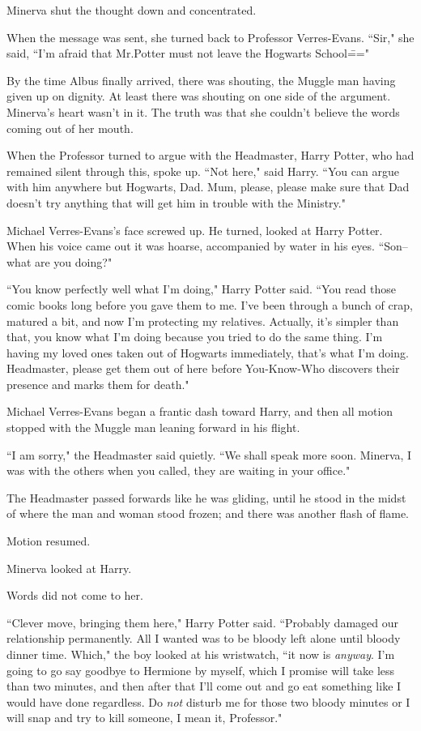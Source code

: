 Minerva shut the thought down and concentrated.

When the message was sent, she turned back to Professor Verres-Evans. ``Sir," she said, ``I'm afraid that Mr.\?Potter must not leave the Hogwarts School\==="

By the time Albus finally arrived, there was shouting, the Muggle man having given up on dignity. At least there was shouting on one side of the argument. Minerva's heart wasn't in it. The truth was that she couldn't believe the words coming out of her mouth.

When the Professor turned to argue with the Headmaster, Harry Potter, who had remained silent through this, spoke up. ``Not here," said Harry. ``You can argue with him anywhere but Hogwarts, Dad. Mum, please, please make sure that Dad doesn't try anything that will get him in trouble with the Ministry."

Michael Verres-Evans's face screwed up. He turned, looked at Harry Potter. When his voice came out it was hoarse, accompanied by water in his eyes. ``Son\---what are you doing?"

``You know perfectly well what I'm doing," Harry Potter said. ``You read those comic books long before you gave them to me. I've been through a bunch of crap, matured a bit, and now I'm protecting my relatives. Actually, it's simpler than that, you know what I'm doing because you tried to do the same thing. I'm having my loved ones taken out of Hogwarts immediately, that's what I'm doing. Headmaster, please get them out of here before You-Know-Who discovers their presence and marks them for death."

Michael Verres-Evans began a frantic dash toward Harry, and then all motion stopped with the Muggle man leaning forward in his flight.

``I am sorry," the Headmaster said quietly. ``We shall speak more soon. Minerva, I was with the others when you called, they are waiting in your office."

The Headmaster passed forwards like he was gliding, until he stood in the midst of where the man and woman stood frozen; and there was another flash of flame.

Motion resumed.

Minerva looked at Harry.

Words did not come to her.

``Clever move, bringing them here," Harry Potter said. ``Probably damaged our relationship permanently. All I wanted was to be bloody left alone until bloody dinner time. Which," the boy looked at his wristwatch, ``it now is \emph{anyway}. I'm going to go say goodbye to Hermione by myself, which I promise will take less than two minutes, and then after that I'll come out and go eat something like I would have done regardless. Do \emph{not} disturb me for those two bloody minutes or I will snap and try to kill someone, I mean it, Professor."

